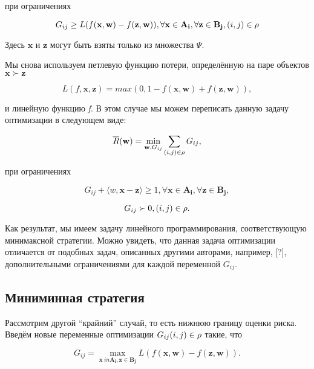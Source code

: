 \documentclass[12pt,a4paper,oneside]{article}
\begin{document}
\par
при ограничениях

\[
G_{ij} \geq L (f(\mathbf{x}, \mathbf{w}) - f(\mathbf{z}, \mathbf{w})), \forall \mathbf{x} \in \mathbf{A_i}, \forall \mathbf{z} \in \mathbf{B_j}, (i, j) \in \mathrm{\rho}
\]

\par
Здесь \(\mathbf{x}\) и \(\mathbf{z}\) могут быть взяты только из множества \(\Psi\). 

\par
Мы снова используем петлевую функцию потери, определённую на паре объектов \(\mathbf{x} \succ \mathbf{z}\)

\[
L(f, \mathbf{x}, \mathbf{z}) = max (0,1 - f(\mathbf{x}, \mathbf{w}) + f(\mathbf{z}, \mathbf{w})),
\]

\par
и линейную функцию \emph{f}. 
В этом случае мы можем переписать данную задачу оптимизации в следующем виде:

\[
\overline{R}(\mathbf{w}) = \underset{\mathbf{w}, G_{ij}}{\operatorname{min}} \sum \limits_{(i, j) \in \mathrm{\rho}} G_{ij},
\]

\par
при ограничениях

\[
G_{ij} + \langle w, \mathbf{x} - \mathbf{z} \rangle \geq 1, \forall \mathbf{x} \in \mathbf{A_i}, \forall \mathbf{z} \in \mathbf{B_j}, 
\]

\[
G_{ij} \succ 0, (i, j) \in \mathrm{\rho}.
\]

\par
Как результат, мы имеем задачу линейного программирования, соответствующую минимаксной стратегии. 
Можно увидеть, что данная задача оптимизации отличается от подобных задач, описанных другими авторами, например, [?], дополнительными ограничениями для каждой переменной \(G_{ij}\). 

\subsection{Миниминная стратегия}

\par
Рассмотрим другой ``крайний'' случай, то есть нижнюю границу оценки риска. 
Введём новые переменные оптимизации \(G_{ij} (i, j) \in \mathrm{\rho}\) такие, что

\[
G_{ij} = \underset{\mathbf{x} \ in \mathbf{A_i}, \mathbf{z} \in \mathbf{B_j}}{\operatorname{max}} L ( f(\mathbf{x}, \mathbf{w}) - f(\mathbf{z}, \mathbf{w})). 
\]
\end{document}
